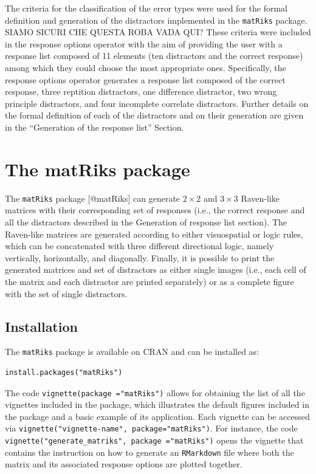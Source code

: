The criteria for the classification of the error types were used for the formal definition and generation of the distractors implemented in the \texttt{matRiks} package.
SIAMO SICURI CHE QUESTA ROBA VADA QUI?
These criteria were included in the response options operator with the aim of providing the user with a response list composed of 11 elements (ten distractors and the correct response) among which they could choose the most appropriate ones.
Specifically, the response options operator generates a response list composed of the correct response, three reptition distractors, one difference distractor, two wrong principle distractors, and four incomplete correlate distractors.
Further details on the formal definition of each of the distractors and on their generation are given in the ``Generation of the response list'' Section.

\section{The matRiks package}\label{the-matriks-package}

The \texttt{matRiks} package {[}@matRiks{]} can generate \(2 \times 2\) and \(3 \times 3\) Raven-like matrices with their corresponding set of responses (i.e., the correct response and all the distractors described in the Generation of response list section).
The Raven-like matrices are generated according to either visuospatial or logic rules, which can be concatenated with three different directional logic, namely vertically, horizontally, and diagonally.
Finally, it is possible to print the generated matrices and set of distractors as either single images (i.e., each cell of the matrix and each distractor are printed separately) or as a complete figure with the set of single distractors.

\subsection{Installation}\label{installation}

The \texttt{matRiks} package is available on CRAN and can be installed as:

\begin{verbatim}
install.packages("matRiks")
\end{verbatim}

The code \texttt{vignette(package\ ="matRiks")} allows for obtaining the list of all the vignettes included in the package, which illustrates the default figures included in the package and a basic example of its application.
Each vignette can be accessed via \texttt{vignette("vignette-name",\ package="matRiks")}.
For instance, the code \texttt{vignette("generate\_matriks",\ package\ ="matRiks")} opens the vignette that contains the instruction on how to generate an \texttt{RMarkdown} file where both the matrix and its associated response options are plotted together.

